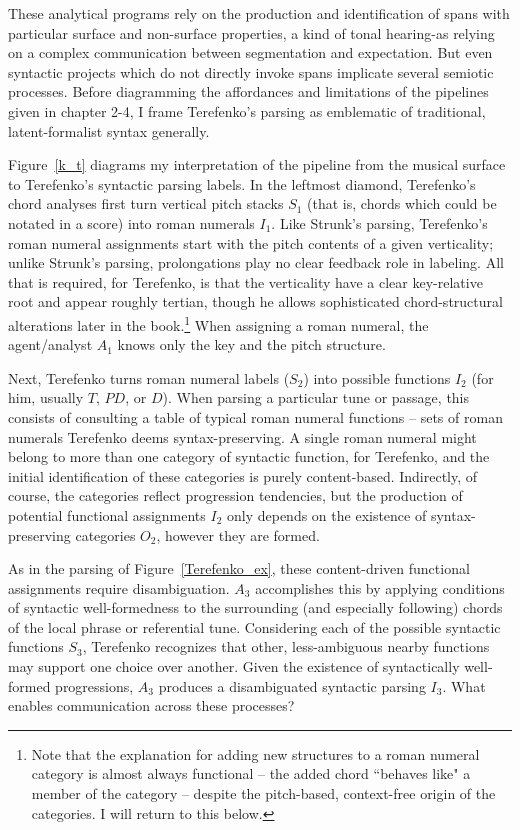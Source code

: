 These analytical programs rely on the production and identification of spans with particular surface and non-surface properties, a kind of tonal hearing-as relying on a complex communication between segmentation and expectation.  But even syntactic projects which do not directly invoke spans implicate several semiotic processes.  Before diagramming the affordances and limitations of the pipelines given in chapter 2-4, I frame Terefenko's parsing as emblematic of traditional, latent-formalist syntax generally.

Figure~\ref{k_t} diagrams my interpretation of the pipeline from the musical surface to Terefenko's syntactic parsing labels.  In the leftmost diamond, Terefenko's chord analyses first turn vertical pitch stacks $S_1$ (that is, chords which could be notated in a score) into roman numerals $I_1$.  Like Strunk's parsing, Terefenko's roman numeral assignments start with the pitch contents of a given verticality; unlike Strunk's parsing, prolongations play no clear feedback role in labeling.  All that is required, for Terefenko, is that the verticality have a clear key-relative root and appear roughly tertian, though he allows sophisticated chord-structural alterations later in the book.\footnote{Note that the explanation for adding new structures to a roman numeral category is almost always functional -- the added chord ``behaves like" a member of the category -- despite the pitch-based, context-free origin of the categories.  I will return to this below.}  When assigning a roman numeral, the agent/analyst $A_1$ knows only the key and the pitch structure.

Next, Terefenko turns roman numeral labels ($S_2$) into possible functions $I_2$ (for him, usually $T$, $PD$, or $D$).  When parsing a particular tune or passage, this consists of consulting a table of typical roman numeral functions -- sets of roman numerals Terefenko deems syntax-preserving.  A single roman numeral might belong to more than one category of syntactic function, for Terefenko, and the initial identification of these categories is purely content-based.  Indirectly, of course, the categories reflect progression tendencies, but the production of potential functional assignments $I_2$ only depends on the existence of syntax-preserving categories $O_2$, however they are formed.

As in the parsing of Figure~\ref{Terefenko_ex}, these content-driven functional assignments require disambiguation.  $A_3$ accomplishes this by applying conditions of syntactic well-formedness to the surrounding (and especially following) chords of the local phrase or referential tune.  Considering each of the possible syntactic functions $S_3$, Terefenko recognizes that other, less-ambiguous nearby functions may support one choice over another.  Given the existence of syntactically well-formed progressions, $A_3$ produces a disambiguated syntactic parsing $I_3$.  What enables communication across these processes?

